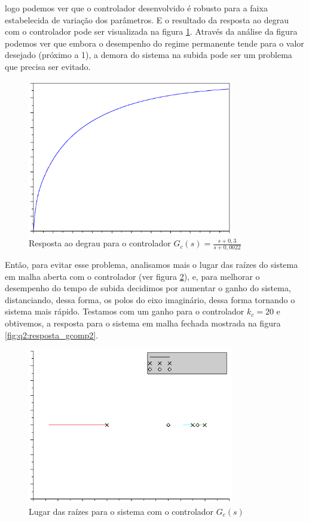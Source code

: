 \noindent logo podemos ver que o controlador desenvolvido é robusto para a faixa
estabelecida de variação dos parâmetros. E o resultado da resposta ao degrau com
o controlador pode ser visualizada na figura \ref{fig:q2:resposta_gcomp1}.
Através da análise da figura podemos ver que embora o desempenho do regime
permanente tende para o valor desejado (próximo a 1), a demora do sistema na
subida pode ser um problema que precisa ser evitado.
 
\begin{figure}[htb]
\centering
\includegraphics[width=0.8\textwidth]{imgs/questao2/resposta_gcomp1}
\caption{Resposta ao degrau para o controlador $G_c(s) = \frac{s+0,3}{s+0,0022}$}
\label{fig:q2:resposta_gcomp1}
\end{figure}

Então, para evitar esse problema, analisamos mais o lugar das raízes do sistema
em malha aberta com o controlador (ver figura \ref{fig:q2:rlocus_gcomp1}), e,
para melhorar o desempenho do tempo de subida decidimos por aumentar o ganho do
sistema, distanciando, dessa forma, os polos do eixo imaginário, dessa forma
tornando o sistema mais rápido. Testamos com um ganho para o controlador $k_c =
20$ e obtivemos, a resposta para o sistema em malha fechada mostrada na figura
\ref{fig:q2:resposta_gcomp2}.

\begin{figure}[htb]
\centering
\includegraphics[width=0.8\textwidth]{imgs/questao2/rlocus_gcma}
\caption{Lugar das raízes para o sistema com o controlador $G_c(s)$}
\label{fig:q2:rlocus_gcomp1}
\end{figure}
 
